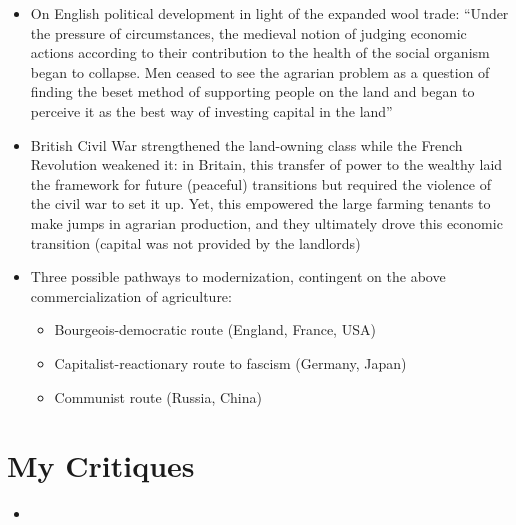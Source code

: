 \documentclass[12pt]{article}
\begin{document}
\begin{itemize}[leftmargin=*, itemsep=4pt]
    \item On English political development in light of the expanded wool trade: ``Under the pressure of circumstances, the medieval notion of judging economic actions according to their contribution to the health of the social organism began to collapse. Men ceased to see the agrarian problem as a question of finding the beset method of supporting people on the land and began to perceive it as the best way of investing capital in the land''
    \item British Civil War strengthened the land-owning class while the French Revolution weakened it: in Britain, this transfer of power to the wealthy laid the framework for future (peaceful) transitions but required the violence of the civil war to set it up. Yet, this empowered the large farming tenants to make jumps in agrarian production, and they ultimately drove this economic transition (capital was not provided by the landlords)
    \item Three possible pathways to modernization, contingent on the above commercialization of agriculture:
    \begin{itemize}
        \item Bourgeois-democratic route (England, France, USA)
        \item Capitalist-reactionary route to fascism (Germany, Japan)
        \item Communist route (Russia, China)
    \end{itemize}
\end{itemize}


\section{My Critiques}

\begin{itemize}
    \item
\end{itemize}
\end{document}
